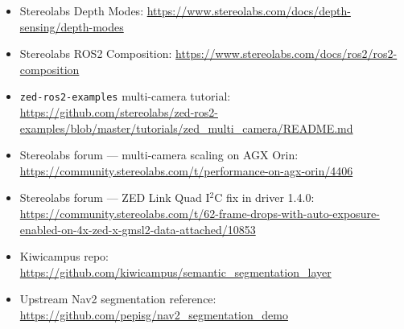 \documentclass[11pt]{article}
\begin{document}
\begin{itemize}[leftmargin=2em,nosep]
\item Stereolabs Depth Modes: \url{https://www.stereolabs.com/docs/depth-sensing/depth-modes}
\item Stereolabs ROS2 Composition: \url{https://www.stereolabs.com/docs/ros2/ros2-composition}
\item \texttt{zed-ros2-examples} multi-camera tutorial: \url{https://github.com/stereolabs/zed-ros2-examples/blob/master/tutorials/zed_multi_camera/README.md}
\item Stereolabs forum --- multi-camera scaling on AGX Orin: \url{https://community.stereolabs.com/t/performance-on-agx-orin/4406}
\item Stereolabs forum --- ZED Link Quad I$^2$C fix in driver 1.4.0: \url{https://community.stereolabs.com/t/62-frame-drops-with-auto-exposure-enabled-on-4x-zed-x-gmsl2-data-attached/10853}
\item Kiwicampus repo: \url{https://github.com/kiwicampus/semantic_segmentation_layer}
\item Upstream Nav2 segmentation reference: \url{https://github.com/pepisg/nav2_segmentation_demo}
\end{itemize}
\end{document}
